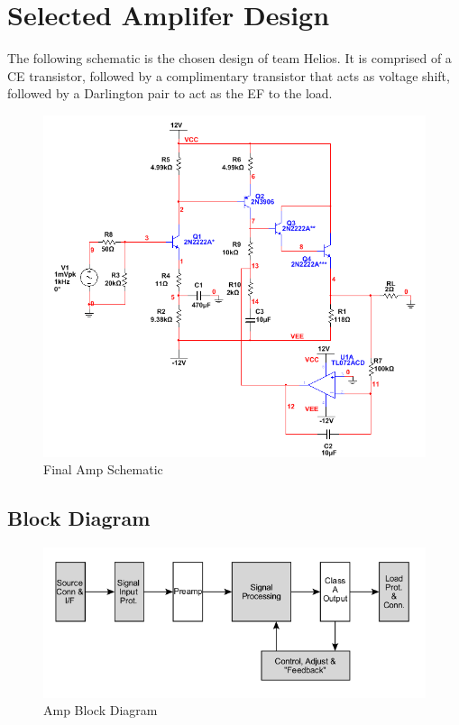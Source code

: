 \documentclass[journal]{IEEEtran}
\begin{document}
\section{Selected Amplifer Design}

The following schematic is the chosen design of team Helios. It is comprised of a CE transistor, followed by a complimentary transistor that acts as voltage shift, followed by a Darlington pair to act as the EF to the load.

\begin{figure}[H]
\centering
\includegraphics[scale=.35]{final-schem.png}
\caption{Final Amp Schematic}
\label{fig_amp_schem}
\end{figure}

\subsection{Block Diagram}

\begin{figure}[H]
\centering
\includegraphics[scale=.38]{amp-block.png}
\caption{Amp Block Diagram}
\label{fig_amp_block}
\end{figure}
\end{document}
